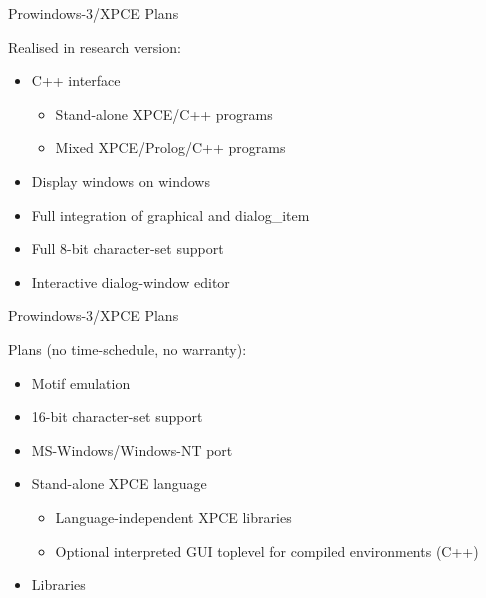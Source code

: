 
\begin{sli}{Prowindows-3/XPCE Plans}

Realised in research version:

\begin{itemize}
    \item C++ interface
    \begin{itemize}
        \item Stand-alone XPCE/C++ programs
	\item Mixed XPCE/Prolog/C++ programs
    \end{itemize}
    \item Display windows on windows
    \item Full integration of graphical and dialog_item
    \item Full 8-bit character-set support
    \item Interactive dialog-window editor
\end{itemize}
\end{sli}


\begin{sli}{Prowindows-3/XPCE Plans}

Plans (no time-schedule, no warranty):

\begin{itemize}
    \item Motif emulation
    \item 16-bit character-set support
    \item MS-Windows/Windows-NT port
    \item Stand-alone XPCE language
    \begin{itemize}
	\item Language-independent XPCE libraries    
	\item Optional interpreted GUI toplevel for compiled environments (C++)
    \end{itemize}
    \item Libraries
\end{itemize}
\end{sli}



